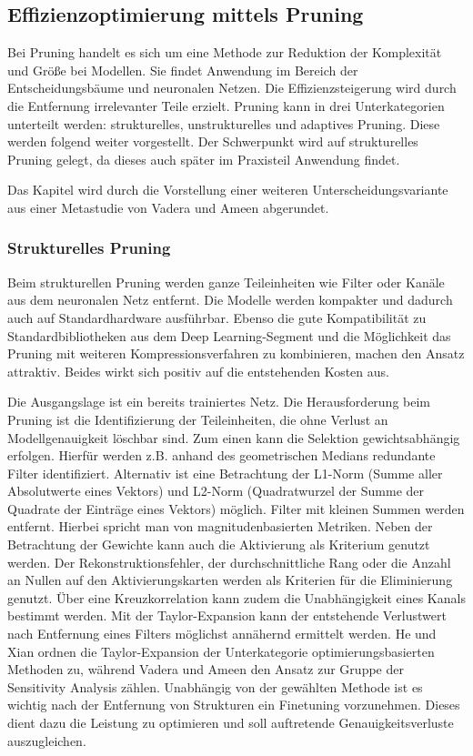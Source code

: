 \subsection{Effizienzoptimierung mittels Pruning}


Bei Pruning handelt es sich um eine Methode zur Reduktion der Komplexität und
Größe bei Modellen. Sie findet Anwendung im Bereich der Entscheidungsbäume und
neuronalen Netzen. Die Effizienzsteigerung wird durch die Entfernung
irrelevanter Teile erzielt. Pruning kann in drei Unterkategorien unterteilt
werden: strukturelles, unstrukturelles und adaptives Pruning. Diese werden
folgend weiter vorgestellt. Der Schwerpunkt wird auf strukturelles Pruning
gelegt, da dieses auch später im Praxisteil Anwendung findet.

Das Kapitel wird durch die Vorstellung einer weiteren Unterscheidungsvariante
aus einer Metastudie von Vadera und Ameen abgerundet.

\subsubsection{Strukturelles Pruning}

Beim strukturellen Pruning werden ganze Teileinheiten wie Filter oder Kanäle
aus dem neuronalen Netz entfernt. Die Modelle werden kompakter und dadurch auch
auf Standardhardware ausführbar. Ebenso die gute Kompatibilität zu
Standardbibliotheken aus dem Deep Learning-Segment und die Möglichkeit das
Pruning mit weiteren Kompressionsverfahren zu kombinieren, machen den Ansatz
attraktiv. Beides wirkt sich positiv auf die entstehenden Kosten aus.
\autocites[Vgl.][S. 1]{he2023structured}[S. 1-2]{vadera2022methods}

Die Ausgangslage ist ein bereits trainiertes Netz. Die Herausforderung beim
Pruning ist die Identifizierung der Teileinheiten, die ohne Verlust an
Modellgenauigkeit löschbar sind. Zum einen kann die Selektion gewichtsabhängig
erfolgen. Hierfür werden z.B. anhand des geometrischen Medians redundante
Filter identifiziert. Alternativ ist eine Betrachtung der L1-Norm (Summe aller
Absolutwerte eines Vektors) und L2-Norm (Quadratwurzel der Summe der Quadrate
der Einträge eines Vektors) möglich. Filter mit kleinen Summen werden entfernt.
Hierbei spricht man von magnitudenbasierten Metriken. Neben der Betrachtung
der Gewichte kann auch die Aktivierung als Kriterium genutzt werden. Der
Rekonstruktionsfehler, der durchschnittliche Rang oder die Anzahl an Nullen
auf den Aktivierungskarten werden als Kriterien für die Eliminierung genutzt.
Über eine Kreuzkorrelation kann zudem die Unabhängigkeit eines Kanals bestimmt
werden. Mit der Taylor-Expansion kann der entstehende Verlustwert nach
Entfernung eines Filters möglichst annähernd ermittelt werden. He und Xian
ordnen die Taylor-Expansion der Unterkategorie optimierungsbasierten Methoden
zu, während Vadera und Ameen den Ansatz zur Gruppe der Sensitivity Analysis
zählen. Unabhängig von der gewählten Methode ist es wichtig nach der Entfernung
von Strukturen ein Finetuning vorzunehmen. Dieses dient dazu die Leistung zu
optimieren und soll auftretende Genauigkeitsverluste auszugleichen. \autocites[Vgl.][S. 1-5]{he2023structured}[S. 1-5]{vadera2022methods}

